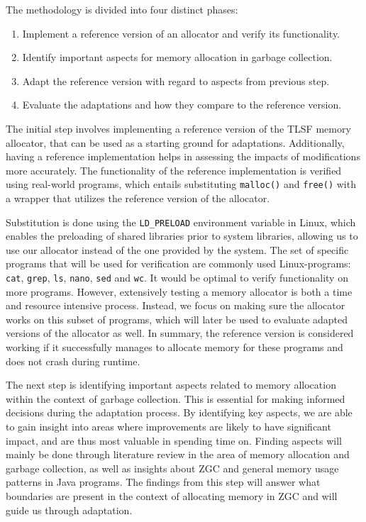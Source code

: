 
The methodology is divided into four distinct phases:

\begin{enumerate}
    \item Implement a reference version of an allocator and verify its functionality.
    \item Identify important aspects for memory allocation in garbage collection.
    \item Adapt the reference version with regard to aspects from previous step.
    \item Evaluate the adaptations and how they compare to the reference version.
\end{enumerate}

The initial step involves implementing a reference version of the TLSF memory allocator, that can be used as a starting ground for adaptations. Additionally, having a reference implementation helps in assessing the impacts of modifications more accurately. The functionality of the reference implementation is verified using real-world programs, which entails substituting \texttt{malloc()} and \texttt{free()} with a wrapper that utilizes the reference version of the allocator. 

Substitution is done using the \texttt{LD\_PRELOAD} environment variable in Linux, which enables the preloading of shared libraries prior to system libraries, allowing us to use our allocator instead of the one provided by the system. The set of specific programs that will be used for verification are commonly used Linux-programs: \texttt{cat}, \texttt{grep}, \texttt{ls}, \texttt{nano}, \texttt{sed} and \texttt{wc}. It would be optimal to verify functionality on more programs. However, extensively testing a memory allocator is both a time and resource intensive process. Instead, we focus on making sure the allocator works on this subset of programs, which will later be used to evaluate adapted versions of the allocator as well. In summary, the reference version is considered working if it successfully manages to allocate memory for these programs and does not crash during runtime.

The next step is identifying important aspects related to memory allocation within the context of garbage collection. This is essential for making informed decisions during the adaptation process. By identifying key aspects, we are able to gain insight into areas where improvements are likely to have significant impact, and are thus most valuable in spending time on. Finding aspects will mainly be done through literature review in the area of memory allocation and garbage collection, as well as insights about ZGC and general memory usage patterns in Java programs. The findings from this step will answer what boundaries are present in the context of allocating memory in ZGC and will guide us through adaptation.

